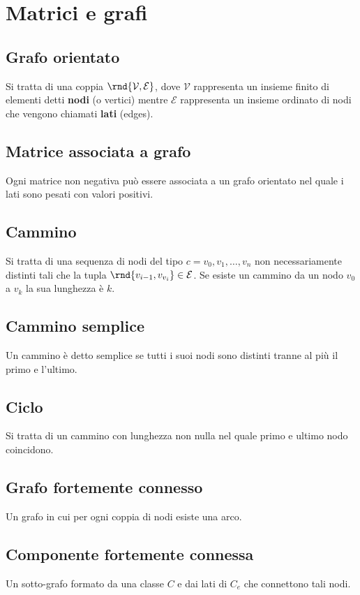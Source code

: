 \documentclass[\main/main.tex]{subfiles}
\begin{document}
\section{Matrici e grafi}
\subsection{Grafo orientato}
Si tratta di una coppia \(\rnd{\mathcal{V}, \mathcal{E}}\), dove \(\mathcal{V}\) rappresenta un insieme finito di elementi detti \textbf{nodi} (o vertici) mentre \(\mathcal{E}\) rappresenta un insieme ordinato di nodi che vengono chiamati \textbf{lati} (edges).

\subsection{Matrice associata a grafo}
Ogni matrice non negativa può essere associata a un grafo orientato nel quale i lati sono pesati con valori positivi.

\subsection{Cammino}
Si tratta di una sequenza di nodi del tipo \(c = {v_0, v_1, \ldots, v_n}\) non necessariamente distinti tali che la tupla \(\rnd{v_{i-1}, v_{v_i}} \in \mathcal{E}\). Se esiste un cammino da un nodo \(v_0\) a \(v_k\) la sua lunghezza è \(k\).

\subsection{Cammino semplice}
Un cammino è detto semplice se tutti i suoi nodi sono distinti tranne al più il primo e l'ultimo.

\subsection{Ciclo}
Si tratta di un cammino con lunghezza non nulla nel quale primo e ultimo nodo coincidono.

\subsection{Grafo fortemente connesso}
Un grafo in cui per ogni coppia di nodi esiste una arco.

\subsection{Componente fortemente connessa}
Un sotto-grafo formato da una classe \(C\) e dai lati di \(C_e\) che connettono tali nodi.
\end{document}
